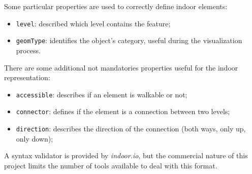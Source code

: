 Some particular properties are used to correctly define indoor elements:

\begin{itemize}
\itemsep1pt\parskip0pt
\item
 \texttt{level}: described which level contains the feature;
\item
 \texttt{geomType}: identifies the object's
 category, useful during the visualization
 process.
\end{itemize}

There are some additional not mandatories properties useful for
the indoor representation:

\begin{itemize}
\itemsep1pt\parskip0pt
\item
 \texttt{accessible}: describes if an element is walkable or not;
\item
 \texttt{connector}: defines if the element is a connection between two
 levels;
\item
 \texttt{direction}: describes the direction of the connection (both
 ways, only up, only down);
\end{itemize}

A syntax validator is provided by \emph{indoor.io}, but the commercial nature
of this project limits the number of tools available to deal with this
format.
